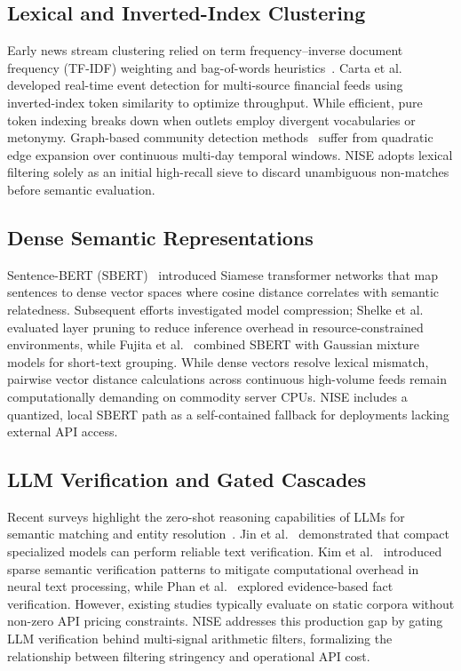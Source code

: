 \documentclass[conference]{IEEEtran}
\begin{document}
\subsection{Lexical and Inverted-Index Clustering}
Early news stream clustering relied on term frequency--inverse document frequency (TF-IDF) weighting and bag-of-words heuristics~\cite{salton1988}.
Carta et al.~\cite{carta2022} developed real-time event detection for multi-source financial feeds using inverted-index token similarity to optimize throughput.
While efficient, pure token indexing breaks down when outlets employ divergent vocabularies or metonymy.
Graph-based community detection methods~\cite{aggarwal2012} suffer from quadratic edge expansion over continuous multi-day temporal windows.
NISE adopts lexical filtering solely as an initial high-recall sieve to discard unambiguous non-matches before semantic evaluation.

\subsection{Dense Semantic Representations}
Sentence-BERT (SBERT)~\cite{reimers2019sentence} introduced Siamese transformer networks that map sentences to dense vector spaces where cosine distance correlates with semantic relatedness.
Subsequent efforts investigated model compression; Shelke et al.~\cite{shelke2022} evaluated layer pruning to reduce inference overhead in resource-constrained environments, while Fujita et al.~\cite{fujita2023} combined SBERT with Gaussian mixture models for short-text grouping.
While dense vectors resolve lexical mismatch, pairwise vector distance calculations across continuous high-volume feeds remain computationally demanding on commodity server CPUs.
NISE includes a quantized, local SBERT path as a self-contained fallback for deployments lacking external API access.

\subsection{LLM Verification and Gated Cascades}
Recent surveys highlight the zero-shot reasoning capabilities of LLMs for semantic matching and entity resolution~\cite{zhao2023}.
Jin et al.~\cite{jin2023} demonstrated that compact specialized models can perform reliable text verification.
Kim et al.~\cite{kim2022} introduced sparse semantic verification patterns to mitigate computational overhead in neural text processing, while Phan et al.~\cite{phan2021} explored evidence-based fact verification.
However, existing studies typically evaluate on static corpora without non-zero API pricing constraints.
NISE addresses this production gap by gating LLM verification behind multi-signal arithmetic filters, formalizing the relationship between filtering stringency and operational API cost.
\end{document}
